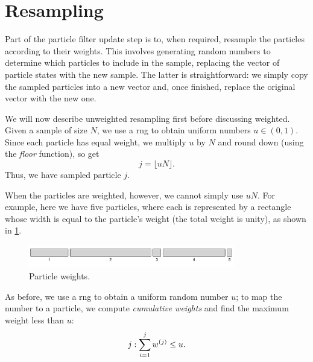 \section{Resampling}
\label{app:particle-resampling}

Part of the particle filter update step is to, when required, resample the particles according to their weights. This involves generating random numbers to determine which particles to include in the sample, replacing the vector of particle states with the new sample. The latter is straightforward: we simply copy the sampled particles into a new vector and, once finished, replace the original vector with the new one.


We will now describe unweighted resampling first before discussing weighted. Given a sample of size $N$, we use a \gls{rng} to obtain uniform numbers $u \in (0, 1)$. Since each particle has equal weight, we multiply $u$ by $N$ and round down (using the \emph{floor} function), so get
\begin{equation}
j = \lfloor uN \rfloor.
\end{equation}
Thus, we have sampled particle $j$.


When the particles are weighted, however, we cannot simply use $uN$. For example, here we have five particles, where each is represented by a rectangle whose width is equal to the particle's weight (the total weight is unity), as shown in \cref{fig:app_weighted_resampling}.
\begin{knitrout}\small
{}\color{fgcolor}\begin{figure}[h]

{\centering \includegraphics[width=0.8\textwidth]{figure/app_weighted_resampling-1} 

}

\caption[Particle weights]{Particle weights.}\label{fig:app_weighted_resampling}
\end{figure}


\end{knitrout}

As before, we use a \gls{rng} to obtain a uniform random number $u$; to map the number to a particle, we compute \emph{cumulative weights} and find the maximum weight less than $u$:
\begin{equation}
j : \sum_{i=1}^j w\vi[j] \leq u.
\end{equation}




